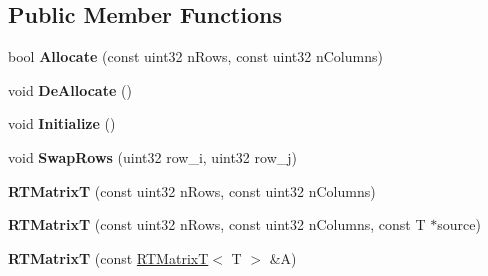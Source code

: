 \subsection*{Public Member Functions}
\begin{DoxyCompactItemize}
\item 
\hypertarget{classRTMatrixT_a4bfc7209460dcb5d9b469d493d8a69ce}{
bool {\bfseries Allocate} (const uint32 nRows, const uint32 nColumns)}
\label{classRTMatrixT_a4bfc7209460dcb5d9b469d493d8a69ce}

\item 
\hypertarget{classRTMatrixT_a59c3e3816d9ad29ad8627e2b3ab649b6}{
void {\bfseries DeAllocate} ()}
\label{classRTMatrixT_a59c3e3816d9ad29ad8627e2b3ab649b6}

\item 
\hypertarget{classRTMatrixT_a4e61750555a3bd0e48514ddeea3dd9bc}{
void {\bfseries Initialize} ()}
\label{classRTMatrixT_a4e61750555a3bd0e48514ddeea3dd9bc}

\item 
\hypertarget{classRTMatrixT_a8925fff21e6a6dac457100cb6eefa345}{
void {\bfseries SwapRows} (uint32 row\_\-i, uint32 row\_\-j)}
\label{classRTMatrixT_a8925fff21e6a6dac457100cb6eefa345}

\item 
\hypertarget{classRTMatrixT_a8bf66bd097cad0600526c8584e2d493f}{
{\bfseries RTMatrixT} (const uint32 nRows, const uint32 nColumns)}
\label{classRTMatrixT_a8bf66bd097cad0600526c8584e2d493f}

\item 
\hypertarget{classRTMatrixT_a84ca2ac42c1c5b945393cf66d83197b0}{
{\bfseries RTMatrixT} (const uint32 nRows, const uint32 nColumns, const T $\ast$source)}
\label{classRTMatrixT_a84ca2ac42c1c5b945393cf66d83197b0}

\item 
\hypertarget{classRTMatrixT_af9e119ed0da618f2730af309f812277f}{
{\bfseries RTMatrixT} (const \hyperlink{classRTMatrixT}{RTMatrixT}$<$ T $>$ \&A)}
\label{classRTMatrixT_af9e119ed0da618f2730af309f812277f}


\end{DoxyCompactItemize}
